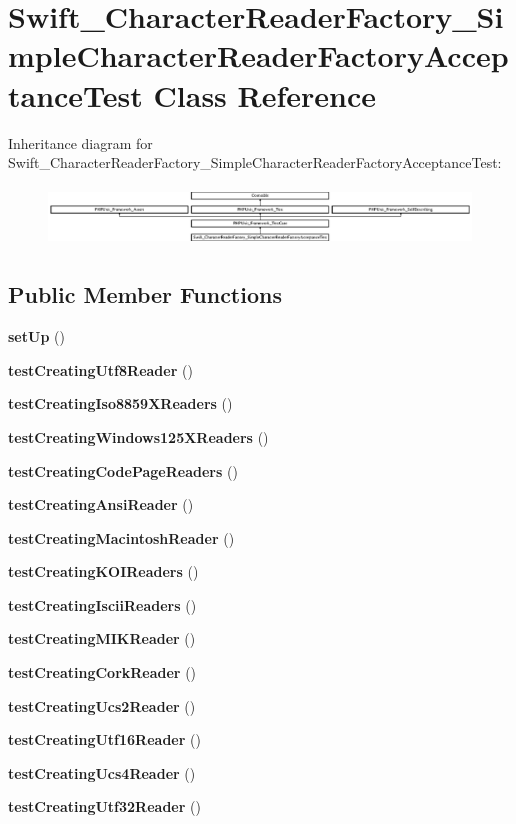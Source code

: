 \section{Swift\+\_\+\+Character\+Reader\+Factory\+\_\+\+Simple\+Character\+Reader\+Factory\+Acceptance\+Test Class Reference}
\label{class_swift___character_reader_factory___simple_character_reader_factory_acceptance_test}
Inheritance diagram for Swift\+\_\+\+Character\+Reader\+Factory\+\_\+\+Simple\+Character\+Reader\+Factory\+Acceptance\+Test\+:\begin{figure}[H]
\begin{center}
\leavevmode
\includegraphics[height=1.578577cm]{class_swift___character_reader_factory___simple_character_reader_factory_acceptance_test}
\end{center}
\end{figure}
\subsection*{Public Member Functions}
\begin{DoxyCompactItemize}
\item 
{\bf set\+Up} ()
\item 
{\bf test\+Creating\+Utf8\+Reader} ()
\item 
{\bf test\+Creating\+Iso8859\+X\+Readers} ()
\item 
{\bf test\+Creating\+Windows125\+X\+Readers} ()
\item 
{\bf test\+Creating\+Code\+Page\+Readers} ()
\item 
{\bf test\+Creating\+Ansi\+Reader} ()
\item 
{\bf test\+Creating\+Macintosh\+Reader} ()
\item 
{\bf test\+Creating\+K\+O\+I\+Readers} ()
\item 
{\bf test\+Creating\+Iscii\+Readers} ()
\item 
{\bf test\+Creating\+M\+I\+K\+Reader} ()
\item 
{\bf test\+Creating\+Cork\+Reader} ()
\item 
{\bf test\+Creating\+Ucs2\+Reader} ()
\item 
{\bf test\+Creating\+Utf16\+Reader} ()
\item 
{\bf test\+Creating\+Ucs4\+Reader} ()
\item 
{\bf test\+Creating\+Utf32\+Reader} ()
\end{DoxyCompactItemize}

